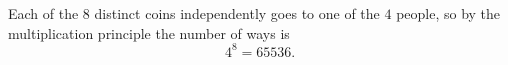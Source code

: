 Each of the $8$ distinct coins independently goes to one of the $4$ people, so by the multiplication principle the number of ways is
\[
4^8=\boxed{65536}.
\]
